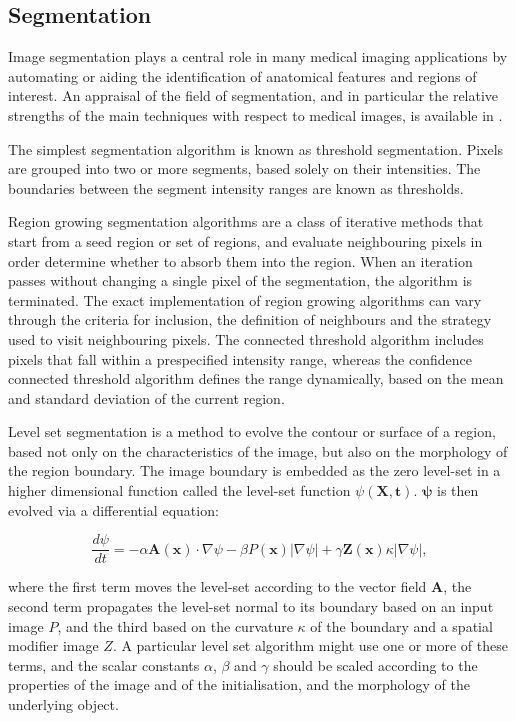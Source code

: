   \subsection{Segmentation} %
  \label{sub:segmentation}
    Image segmentation plays a central role in many medical imaging applications by automating or aiding the identification of anatomical features and regions of interest. An appraisal of the field of segmentation, and in particular the relative strengths of the main techniques with respect to medical images, is available in \cite{Pham1998,Sharma2010}.
    
    The simplest segmentation algorithm is known as threshold segmentation. Pixels are grouped into two or more segments, based solely on their intensities. The boundaries between the segment intensity ranges are known as thresholds. 
    
    Region growing segmentation algorithms are a class of iterative methods that start from a seed region or set of regions, and evaluate neighbouring pixels in order determine whether to absorb them into the region. When an iteration passes without changing a single pixel of the segmentation, the algorithm is terminated. The exact implementation of region growing algorithms can vary through the criteria for inclusion, the definition of neighbours and the strategy used to visit neighbouring pixels. The connected threshold algorithm includes pixels that fall within a prespecified intensity range, whereas the confidence connected threshold algorithm defines the range dynamically, based on the mean and standard deviation of the current region. 
    
    Level set segmentation is a method to evolve the contour or surface of a region, based not only on the characteristics of the image, but also on the morphology of the region boundary. The image boundary is embedded as the zero level-set in a higher dimensional function called the level-set function $\psi(\mathbf{X}, \mathbf{t})$. $\mathbf{\psi}$ is then evolved via a differential equation:
    
    \begin{equation}
      \frac{d\psi}{dt} = -\alpha\mathbf{A}(\mathbf{x}) \cdot \nabla \psi - \beta P(\mathbf{x})|\nabla\psi| + \gamma\mathbf{Z}(\mathbf{x})\kappa|\nabla\psi|,
    \end{equation}
    
    where the first term moves the level-set according to the vector field \textbf{A}, the second term propagates the level-set normal to its boundary based on an input image $P$, and the third based on the curvature $\kappa$ of the boundary and a spatial modifier image $Z$. A particular level set algorithm might use one or more of these terms, and the scalar constants $\alpha$, $\beta$ and $\gamma$ should be scaled according to the properties of the image and of the initialisation, and the morphology of the underlying object.
    

